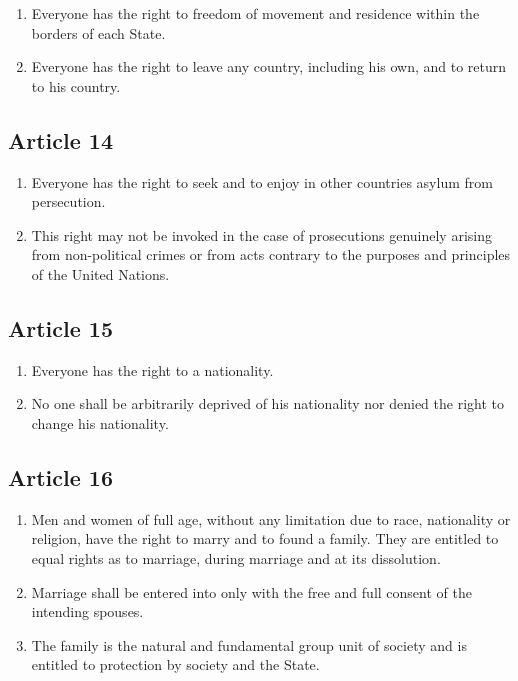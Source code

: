 \documentclass[
  titlepage,
  openright,
  DIV=calc,
  toc=listof,
  listof=nochaptergap]{scrbook}
\begin{document}
\begin{enumerate}
\def\labelenumi{\arabic{enumi}.}
\item
  Everyone has the right to freedom of movement and residence within the
  borders of each State.
\item
  Everyone has the right to leave any country, including his own, and to
  return to his country.
\end{enumerate}

\subsection{Article 14}\label{article-14-3}

\begin{enumerate}
\def\labelenumi{\arabic{enumi}.}
\item
  Everyone has the right to seek and to enjoy in other countries asylum
  from persecution.
\item
  This right may not be invoked in the case of prosecutions genuinely
  arising from non-political crimes or from acts contrary to the
  purposes and principles of the United Nations.
\end{enumerate}

\subsection{Article 15}\label{article-15-3}

\begin{enumerate}
\def\labelenumi{\arabic{enumi}.}
\item
  Everyone has the right to a nationality.
\item
  No one shall be arbitrarily deprived of his nationality nor denied the
  right to change his nationality.
\end{enumerate}

\subsection{Article 16}\label{article-16-3}

\begin{enumerate}
\def\labelenumi{\arabic{enumi}.}
\item
  Men and women of full age, without any limitation due to race,
  nationality or religion, have the right to marry and to found a
  family. They are entitled to equal rights as to marriage, during
  marriage and at its dissolution.
\item
  Marriage shall be entered into only with the free and full consent of
  the intending spouses.
\item
  The family is the natural and fundamental group unit of society and is
  entitled to protection by society and the State.
\end{enumerate}
\end{document}
